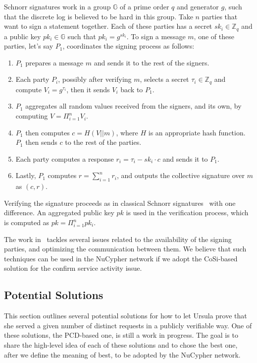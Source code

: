 Schnorr signatures work in a group $\mathbb{G}$ of a prime order $q$ and 
generator $g$, such that the discrete log is believed to be hard in this group. 
Take $n$ parties that want to sign a statement together. 
Each of these parties has a secret $sk_i \in \mathbb{Z}_q$ and a public key 
$pk_i \in \mathbb{G}$ such that $pk_i = g^{sk_i}$. To sign a message $m$, 
one of these parties, let's say $P_1$, coordinates the signing process as follows: 
\begin{enumerate}
\setlength{\itemsep}{0pt}
\item $P_1$ prepares a message $m$ and sends it to the rest of the signers.

\item Each party $P_i$, possibly after verifying 
$m$, selects a secret $\tau_i \in \mathbb{Z}_q$ and compute $V_i = g^{\tau_i}$, 
then it sends $V_i$ back to $P_1$.

\item $P_1$ aggregates all random values received from 
the signers, and its own, by computing $V = \Pi_{i =1}^n V_i$.

\item $P_1$ then computes 
$c = H(V||m)$, where $H$ is an appropriate hash function. $P_1$ then 
sends $c$ to the rest of the parties.

\item Each party computes a response $r_i = \tau_i - sk_i\cdot c$ and 
sends it to $P_1$.

\item Lastly, $P_1$ computes $r = \sum_{i=1}^n r_i$, and outputs the 
collective signature over $m$ as $(c, r)$.
\end{enumerate}


Verifying the signature proceeds as in classical Schnorr signatures~\cite{schnorr1991efficient} with 
one difference. An aggregated public key $pk$ is used in the verification process, 
which is computed as $pk = \Pi_{i=1}^{n} pk_i$.


The work in~\cite{syta2016keeping} tackles several issues related to 
the availability of the 
signing parties, and optimizing the communication between them. 
We believe that such techniques can be used in the NuCypher network if we adopt the 
CoSi-based solution for the confirm service activity issue.


\subsection{Potential Solutions}
\label{solutions}
This section outlines several potential solutions for how to let Ursula prove 
that she served a given number of distinct requests in a publicly verifiable way. 
One of these solutions, the PCD-based one, is still a work in progress. The goal 
is to share the high-level idea of each of these solutions and to chose the best one,
after we define the meaning of best, to be adopted by the NuCypher network.


